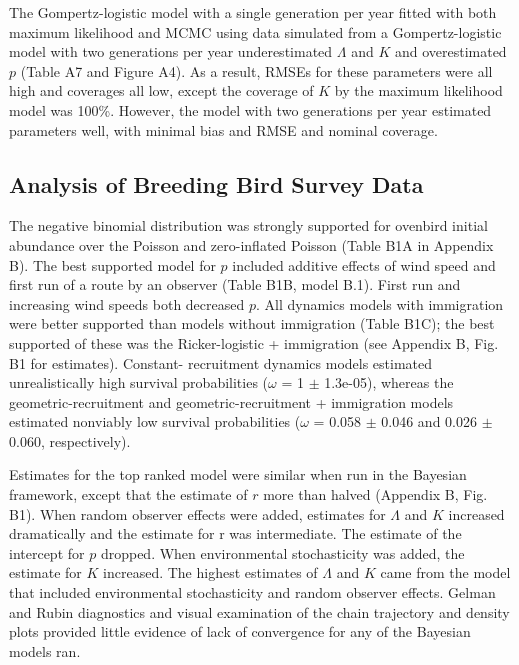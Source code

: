 \documentclass[12pt,english]{article}
\begin{document}
\begin{spacing}{1.9}
\begin{flushleft}
The Gompertz-logistic model with a single generation per year fitted with both maximum likelihood and
MCMC using data simulated from a Gompertz-logistic model with two generations per year underestimated 
$\Lambda$  and $K$ and %
overestimated $p$ (Table A7 and Figure A4).  As a result, RMSEs for these parameters 
were all high and coverages all low, except the coverage of $K$ by the maximum 
likelihood model was 100\%.  However, the model with two generations per year 
estimated parameters well, with minimal bias and RMSE and nominal coverage.

\subsection*{Analysis of Breeding Bird Survey Data}


The negative binomial distribution was strongly supported for ovenbird
initial abundance over the Poisson and zero-inflated Poisson
(Table B1A in Appendix B). 
The best supported model for $p$ included additive effects of wind speed
and first run of a route by an observer (Table B1B, model B.1). First run 
and increasing wind speeds both decreased $p$. All dynamics models 
with immigration were better supported than models without immigration 
(Table B1C); the best supported of these was the Ricker-logistic + immigration 
(see Appendix B, Fig. B1 for estimates).
Constant- recruitment dynamics models estimated unrealistically high
survival probabilities ($\omega$ = 1 $\pm$ 1.3e-05), whereas 
the geometric-recruitment and geometric-recruitment + immigration
models estimated nonviably low survival probabilities 
($\omega$ =
0.058 $\pm$ 0.046 and 0.026 $\pm$ 0.060, respectively). 

Estimates for the top ranked model 
were similar when
run in the Bayesian framework, except that the estimate of $r$
more than halved (Appendix B, Fig. B1). 
When random observer effects
were added, estimates for $\Lambda$ and $K$ increased dramatically
and the estimate for r was intermediate. The 
estimate of the intercept for $p$ dropped. 
When environmental stochasticity was added, the estimate for $K$ increased. 
The highest estimates of $\Lambda$ and $K$ came 
from the model that included environmental stochasticity and random observer effects. 
Gelman and Rubin diagnostics and visual examination of the chain trajectory and density plots
provided little evidence of lack of convergence for any of the Bayesian models ran.  


\end{flushleft}
\end{spacing}
\end{document}
